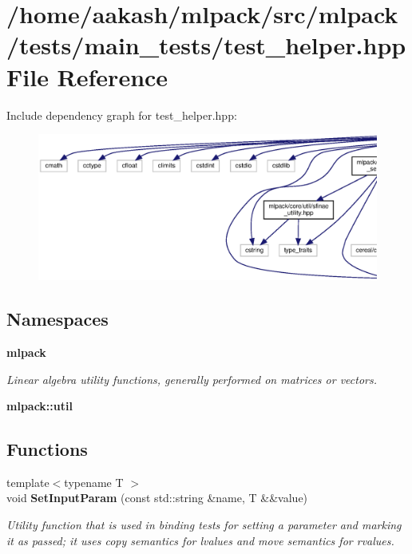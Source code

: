 \section{/home/aakash/mlpack/src/mlpack/tests/main\+\_\+tests/test\+\_\+helper.hpp File Reference}
\label{test__helper_8hpp}
Include dependency graph for test\+\_\+helper.\+hpp\+:
\nopagebreak
\begin{figure}[H]
\begin{center}
\leavevmode
\includegraphics[width=350pt]{test__helper_8hpp__incl}
\end{center}
\end{figure}
\subsection*{Namespaces}
\begin{DoxyCompactItemize}
\item 
 \textbf{ mlpack}
\begin{DoxyCompactList}\small\item\em Linear algebra utility functions, generally performed on matrices or vectors. \end{DoxyCompactList}\item 
 \textbf{ mlpack\+::util}
\end{DoxyCompactItemize}
\subsection*{Functions}
\begin{DoxyCompactItemize}
\item 
{\footnotesize template$<$typename T $>$ }\\void \textbf{ Set\+Input\+Param} (const std\+::string \&name, T \&\&value)
\begin{DoxyCompactList}\small\item\em Utility function that is used in binding tests for setting a parameter and marking it as passed; it uses copy semantics for lvalues and move semantics for rvalues. \end{DoxyCompactList}\end{DoxyCompactItemize}


